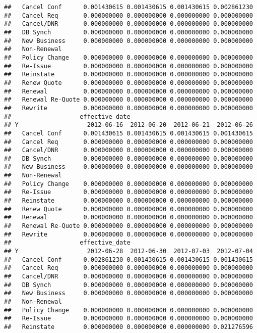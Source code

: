 \documentclass[]{article}
\begin{document}
\begin{verbatim}
##   Cancel Conf      0.001430615 0.001430615 0.001430615 0.002861230
##   Cancel Req       0.000000000 0.000000000 0.000000000 0.000000000
##   Cancel/DNR       0.000000000 0.000000000 0.000000000 0.000000000
##   DB Synch         0.000000000 0.000000000 0.000000000 0.000000000
##   New Business     0.000000000 0.000000000 0.000000000 0.000000000
##   Non-Renewal                                                     
##   Policy Change    0.000000000 0.000000000 0.000000000 0.000000000
##   Re-Issue         0.000000000 0.000000000 0.000000000 0.000000000
##   Reinstate        0.000000000 0.000000000 0.000000000 0.000000000
##   Renew Quote      0.000000000 0.000000000 0.000000000 0.000000000
##   Renewal          0.000000000 0.000000000 0.000000000 0.000000000
##   Renewal Re-Quote 0.000000000 0.000000000 0.000000000 0.000000000
##   Rewrite          0.000000000 0.000000000 0.000000000 0.000000000
##                   effective_date
## Y                   2012-06-16  2012-06-20  2012-06-21  2012-06-26
##   Cancel Conf      0.001430615 0.001430615 0.001430615 0.001430615
##   Cancel Req       0.000000000 0.000000000 0.000000000 0.000000000
##   Cancel/DNR       0.000000000 0.000000000 0.000000000 0.000000000
##   DB Synch         0.000000000 0.000000000 0.000000000 0.000000000
##   New Business     0.000000000 0.000000000 0.000000000 0.000000000
##   Non-Renewal                                                     
##   Policy Change    0.000000000 0.000000000 0.000000000 0.000000000
##   Re-Issue         0.000000000 0.000000000 0.000000000 0.000000000
##   Reinstate        0.000000000 0.000000000 0.000000000 0.000000000
##   Renew Quote      0.000000000 0.000000000 0.000000000 0.000000000
##   Renewal          0.000000000 0.000000000 0.000000000 0.000000000
##   Renewal Re-Quote 0.000000000 0.000000000 0.000000000 0.000000000
##   Rewrite          0.000000000 0.000000000 0.000000000 0.000000000
##                   effective_date
## Y                   2012-06-28  2012-06-30  2012-07-03  2012-07-04
##   Cancel Conf      0.002861230 0.001430615 0.001430615 0.001430615
##   Cancel Req       0.000000000 0.000000000 0.000000000 0.000000000
##   Cancel/DNR       0.000000000 0.000000000 0.000000000 0.000000000
##   DB Synch         0.000000000 0.000000000 0.000000000 0.000000000
##   New Business     0.000000000 0.000000000 0.000000000 0.000000000
##   Non-Renewal                                                     
##   Policy Change    0.000000000 0.000000000 0.000000000 0.000000000
##   Re-Issue         0.000000000 0.000000000 0.000000000 0.000000000
##   Reinstate        0.000000000 0.000000000 0.000000000 0.021276596

\end{verbatim}
\end{document}
